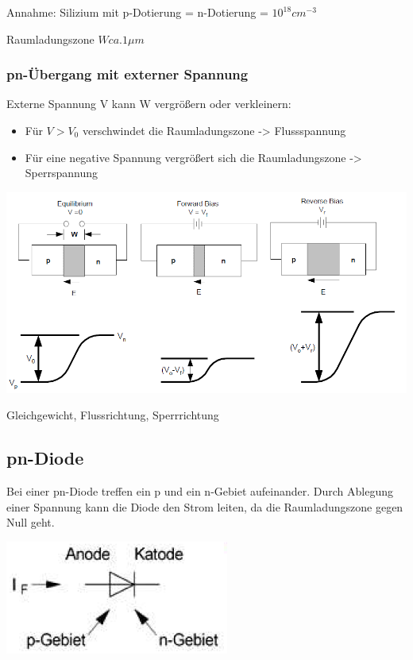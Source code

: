 		Annahme: Silizium mit p-Dotierung = n-Dotierung = $10^{18} cm^{-3}$
		
		Raumladungszone $W ca. 1 \mu m$
	
	\subsubsection{pn-Übergang mit externer Spannung}
	Externe Spannung V kann W vergrößern oder verkleinern:
	\begin{itemize}
		\item Für $V > V_0$ verschwindet die Raumladungszone -> Flussspannung 
		\item Für eine negative Spannung vergrößert sich die Raumladungszone -> Sperrspannung
	\end{itemize}
	\begin{center}
		\includegraphics[width=0.6\linewidth]{Kapitel/Kap08/pnUebergangExterneSpannung}
	\end{center}
	\begin{center}
		Gleichgewicht, Flussrichtung, Sperrrichtung
	\end{center}
	
\subsection{pn-Diode}
	Bei einer pn-Diode treffen ein p und ein n-Gebiet aufeinander. Durch Ablegung einer Spannung kann die Diode den Strom leiten, da die Raumladungszone gegen Null geht.
	\begin{center}
		\includegraphics[width=0.3\linewidth]{Kapitel/Kap08/Diode}
	\end{center}

